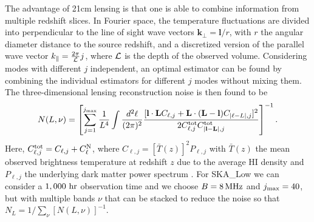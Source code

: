 \documentclass{PoS}
\begin{document}
 The advantage of 21cm lensing is that one is able to combine
information from multiple redshift slices. In Fourier space, the
temperature fluctuations are divided into perpendicular to the line of
sight wave vectors $\mathbf{k_\perp}=\mathbf{l}/r$, with $r$ the angular diameter distance to the source redshift, and a
discretized version of the parallel wave vector $k_\parallel =
\frac{2\pi}{{\cal L}}j$, where ${\cal L}$ is the depth of the observed
volume. Considering modes with different $j$ independent, an optimal
estimator can be found by combining the individual estimators for
different $j$ modes without mixing them. The three-dimensional lensing reconstruction noise is then found to be  \cite{Zahn:2005ap}\begin{equation}
N(L,\nu) =  \left[\sum_{j=1}^{j_{\rm max}} \frac{1}{L^4}\int \frac{d^2\ell}{(2\pi)^2}  \frac{[\mathbf{l} \cdot \mathbf{L} C_{\ell,j}+\mathbf{L} \cdot (\mathbf{L}-\mathbf{l})
C_{|\ell-L|,j}]^2}{2 C^{\rm tot}_{\ell,j}C^{\rm tot}_{|\mathbf{l}-\mathbf{L}|,j}}\right]^{-1}.
\end{equation}
Here, $C^{\rm tot}_{\ell,j}=C_{\ell,j}+C^{\rm N}_\ell$, where $C_{\ell,j}=[\bar{T}(z)]^2P_{\ell,j}$ with $\bar{T}(z)$ the mean observed brightness temperature at redshift $z$ due to the average HI density and $P_{\ell,j}$ the underlying dark matter power spectrum  \cite{Zahn:2005ap}. 
For SKA\_Low we can consider a $1,000~{\rm hr}$ observation time and we choose $B = 8 \, {\rm MHz}$ and $j_{\rm max}=40$, but with multiple bands $\nu$ that can be stacked to reduce the noise so that $N_L = 1/\displaystyle\sum_{\nu} [N(L,\nu)]^{-1}$. 
 
\end{document}
